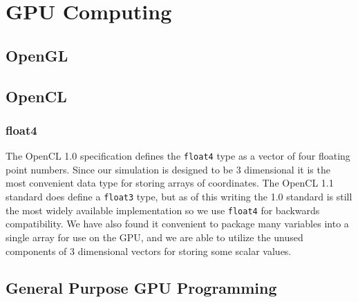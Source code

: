 \chapter{GPU Computing}

\section{OpenGL}
\section{OpenCL}

\subsection{float4}
The OpenCL 1.0 specification defines the \verb|float4| type as a vector of four
floating point numbers. Since our simulation is designed to be 3 dimensional it
is the most convenient data type for storing arrays of coordinates. The OpenCL
1.1 standard does define a \verb|float3| type, but as of this writing the 1.0
standard is still the most widely available implementation so we use \verb|float4|
for backwards compatibility. We have also found it convenient to package many
variables into a single array for use on the GPU, and we are able to utilize
the unused components of 3 dimensional vectors for storing some scalar values.


\section{General Purpose GPU Programming}


